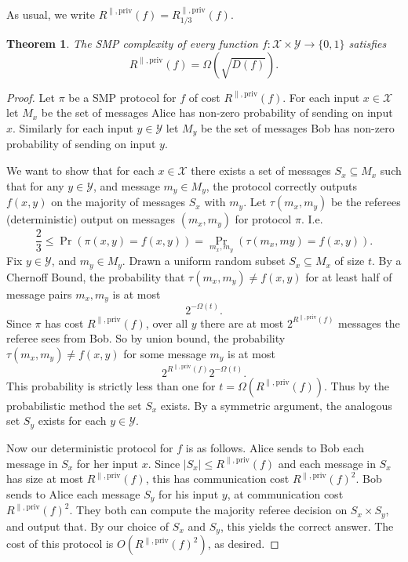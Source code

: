 \documentclass[11pt]{amsart}
\theoremstyle{plain}
\newtheorem{theorem}{Theorem}
\theoremstyle{definition}
\theoremstyle{plain}
\newcommand{\calX}{\mathcal{X}}
\newcommand{\calY}{\mathcal{Y}}
\begin{document}
As usual, we write $R^{\parallel,\mathrm{priv}}(f) = R^{\parallel,\mathrm{priv}}_{1/3}(f)$.

\begin{theorem}
The SMP complexity of every function $f : \calX \times \calY \to \{0,1\}$ satisfies
\[
R^{\parallel,\mathrm{priv}}(f) = \Omega(\sqrt{D(f)}).
\]
\end{theorem}

\begin{proof}
	Let $\pi$ be a SMP protocol for $f$ of cost $R^{\parallel,\mathrm{priv}}(f)$. For each input $x\in\calX$ let $M_x$ be the set of messages Alice has non-zero probability of sending on input $x$. Similarly for each input $y\in\calY$ let $M_y$ be the set of messages Bob has non-zero probability of sending on input $y$.
	
	We want to show that for each $x \in \calX$ there exists a set of messages $S_x \subseteq M_x$ such that for any $y \in \calY$, and message $m_y \in M_y$, the protocol correctly outputs $f(x,y)$ on the majority of messages $S_x$ with $m_y$. Let $\tau(m_x,m_y)$ be the referees (deterministic) output on messages $(m_x,m_y)$ for protocol $\pi$. I.e.
	$$\frac{2}{3} \leq \Pr(\pi(x,y) = f(x,y)) = \Pr_{m_x,m_y}(\tau(m_x,my) = f(x,y)).$$
	Fix $y\in \calY$, and $m_y \in M_y$. Drawn a uniform random subset $S_x \subseteq M_x$  of size $t$. By a Chernoff Bound, the probability that $\tau(m_x,m_y) \neq f(x,y)$ for at least half of message pairs $m_x, m_y$ is at most
	$$2^{-\Omega(t)}.$$
	Since $\pi$ has cost $R^{\parallel,\mathrm{priv}}(f)$, over all $y$ there are at most $2^{R^{\parallel,\mathrm{priv}}(f)}$ messages the referee sees from Bob. So by union bound, the probability $\tau(m_x,m_y) \neq f(x,y)$ for some message $m_y$ is at most
	$$2^{R^{\parallel,\mathrm{priv}}(f)}2^{-\Omega(t)}.$$
	This probability is strictly less than one for $t = \Omega(R^{\parallel,\mathrm{priv}}(f))$. Thus by the probabilistic method the set $S_x$ exists. By a symmetric argument, the analogous set $S_y$ exists for each $y \in \calY$.
	
	Now our deterministic protocol for $f$ is as follows. Alice sends to Bob each message in $S_x$ for her input $x$. Since $|S_x| \leq R^{\parallel,\mathrm{priv}}(f)$ and each message in $S_x$ has size at most $R^{\parallel,\mathrm{priv}}(f)$, this has communication cost $R^{\parallel,\mathrm{priv}}(f)^2$. Bob sends to Alice each message $S_y$ for his input $y$, at communication cost $R^{\parallel,\mathrm{priv}}(f)^2$. They both can compute the majority referee decision on $S_x\times S_y$, and output that. By our choice of $S_x$ and $S_y$, this yields the correct answer. The cost of this protocol is $O(R^{\parallel,\mathrm{priv}}(f)^2)$, as desired.
\end{proof}
\end{document}
